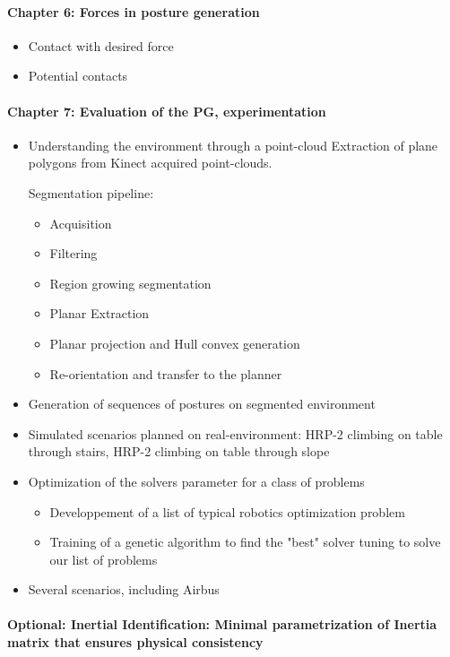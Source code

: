\documentclass{article}
\begin{document}

\paragraph{Chapter 6: Forces in posture generation}
\begin{itemize}
  \item{Contact with desired force}
  \item{Potential contacts}
\end{itemize}



\paragraph{Chapter 7: Evaluation of the PG, experimentation}
\begin{itemize}
  \item Understanding the environment through a point-cloud
    Extraction of plane polygons from Kinect acquired point-clouds.

    Segmentation pipeline:
    \begin{itemize}
      \item Acquisition
      \item Filtering
      \item Region growing segmentation
      \item Planar Extraction
      \item Planar projection and Hull convex generation
      \item Re-orientation and transfer to the planner
    \end{itemize}
  \item Generation of sequences of postures on segmented environment
  \item{Simulated scenarios planned on real-environment: HRP-2 climbing on table through stairs, HRP-2 climbing on table through slope}
  \item{Optimization of the solvers parameter for a class of problems}
    \begin{itemize}
      \item Developpement of a list of typical robotics optimization problem
      \item Training of a genetic algorithm to find the "best" solver tuning to solve our list of problems
    \end{itemize}
  \item{Several scenarios, including Airbus}
\end{itemize}


\paragraph{Optional: Inertial Identification: Minimal parametrization of Inertia matrix that ensures physical consistency}
\end{document}
